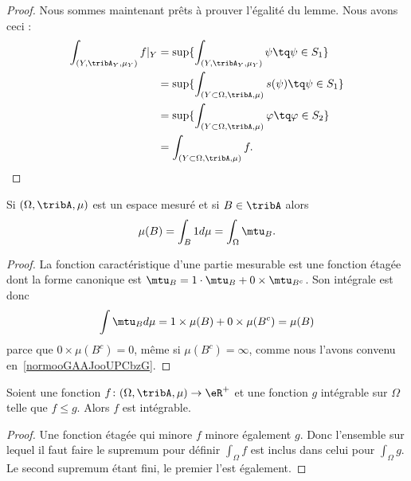 \begin{proof}
    Nous sommes maintenant prêts à prouver l'égalité du lemme. Nous avons ceci :
    \begin{subequations}
        \begin{align}
            \int_{(Y,\tribA_Y,\mu_Y)}f|_Y&=\sup\{ \int_{(Y,\tribA_Y,\mu_Y)}\psi\tq \psi\in S_1 \}\\
            &=\sup\{ \int_{(Y\subset \Omega,\tribA,\mu)}s(\psi)\tq \psi\in S_1 \}\\
            &=\sup\{ \int_{(Y\subset \Omega,\tribA,\mu)}\varphi\tq \varphi\in S_2 \}\\
            &=\int_{(Y\subset\Omega,\tribA,\mu)}f.
        \end{align}
    \end{subequations}
\end{proof}

\begin{lemma}       \label{LemooPJLNooVKrBhN}
    Si \( (\Omega,\tribA,\mu)\) est un espace mesuré et si \( B\in \tribA\) alors
    \begin{equation}
        \mu(B)=\int_B1d\mu=\int_{\Omega}\mtu_B.
    \end{equation}
\end{lemma}

\begin{proof}
    La fonction caractéristique d'une partie mesurable est une fonction étagée dont la forme canonique est \( \mtu_B=1\cdot \mtu_B+0\times \mtu_{B^c}\). Son intégrale est donc
    \begin{equation}
        \int\mtu_Bd\mu=1\times \mu(B)+0\times \mu(B^c)=\mu(B)
    \end{equation}
    parce que \( 0\times \mu(B^c)=0\), même si \( \mu(B^c)=\infty\), comme nous l'avons convenu en~\ref{normooGAAJooUPCbzG}.
\end{proof}

\begin{proposition}      \label{PROPooGTMVooPHcrRl}
    Soient une fonction \( f\colon (\Omega,\tribA,\mu)\to \eR^+\) et une fonction \( g\) intégrable sur \( \Omega\) telle que \( f\leq g\). Alors \( f\) est intégrable.
\end{proposition}

\begin{proof}
    Une fonction étagée qui minore \( f\) minore également \( g\). Donc l'ensemble sur lequel il faut faire le supremum pour définir \( \int_{\Omega}f\) est inclus dans celui pour \( \int_{\Omega}g\). Le second supremum étant fini, le premier l'est également.
\end{proof}

